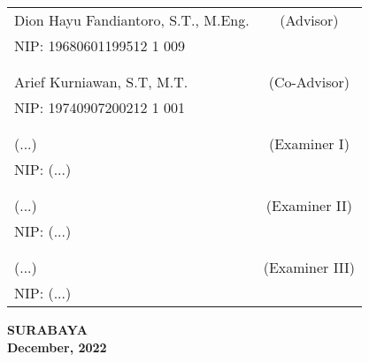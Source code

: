     \noindent
    \begin{tabularx}{\textwidth}{X c}
      Dion Hayu Fandiantoro, S.T., M.Eng.          & (Advisor) \\
      NIP: 19680601199512 1 009        & \\
      &  \\
      &  \\
      Arief Kurniawan, S.T, M.T.     & (Co-Advisor) \\
      NIP: 19740907200212 1 001       & \\
      &  \\
      &  \\
      (...)  & (Examiner I) \\
      NIP: (...)        & \\
      &  \\
      &  \\
      (...)  & (Examiner II) \\
      NIP: (...)        & \\
      &  \\
      &  \\
      (...)             & (Examiner III) \\
      NIP: (...)        & \\
    \end{tabularx}
  \endgroup

  \vspace{4ex}

  \begin{center}
    \textbf{SURABAYA} \\
    \textbf{December, 2022}
  \end{center}
\endgroup
